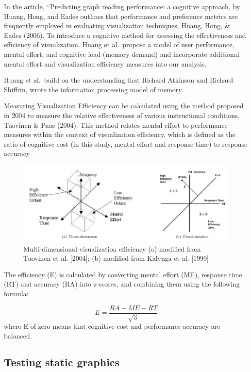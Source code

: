 \documentclass[print]{nuthesis}
\begin{document}
In the article, ``Predicting graph reading performance: a cognitive approach, by Huang, Hong, and Eades outlines that performance and preference metrics are frequently employed in evaluating visualization techniques, Huang, Hong, \& Eades (2006).
To introduce a cognitive method for assessing the effectiveness and efficiency of visualization.
Huang et al.~propose a model of user performance, mental effort, and cognitive load (memory demand) and incorporate additional mental effort and visualization efficiency measures into our analysis.

Huang et al.~build on the understanding that Richard Atkinson and Richard Shiffrin, wrote the information processing model of memory.

Measuring Visualization Efficiency can be calculated using the method proposed in 2004 to measure the relative effectiveness of various instructional conditions, Tuovinen \& Paas (2004).
This method relates mental effort to performance measures within the context of visualization efficiency, which is defined as the ratio of cognitive cost (in this study, mental effort and response time) to response accuracy

\begin{figure}

{\centering \includegraphics[width=0.45\linewidth]{figure/multi_dim_viz} 

}

\caption{Multi-dimensional visualization efficiency (a) modified from Tuovinen et al. [2004]; (b) modified from Kalyuga et al. [1999]}\label{fig:viseff}
\end{figure}

The efficiency (E) is calculated by converting mental effort (ME), response time (RT) and accuracy (RA) into z-scores, and combining them using the following formula:

\[E = \frac{RA - ME - RT}{\sqrt{3}}\]
where E of zero means that cognitive cost and performance accuracy are balanced.

\hypertarget{testing-static-graphics}{%
\subsection{Testing static graphics}\label{testing-static-graphics}}
\end{document}
